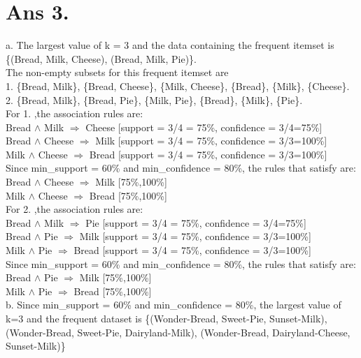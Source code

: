 \documentclass[10pt]{article}
\begin{document}
\section*{Ans 3.}
\begin{flushleft}
a. The largest value of k = 3 and the data containing the frequent itemset is \{(Bread, Milk, Cheese), (Bread, Milk, Pie)\}. \\
The non-empty subsets for this frequent itemset are \\
1. \{Bread, Milk\}, \{Bread, Cheese\}, \{Milk, Cheese\}, \{Bread\}, \{Milk\}, \{Cheese\}.\\
2. \{Bread, Milk\}, \{Bread, Pie\}, \{Milk, Pie\}, \{Bread\}, \{Milk\}, \{Pie\}.\\
\vspace{0.5em}
For 1. ,the association rules are:\\
Bread $\wedge$ Milk $\Rightarrow$ Cheese [support = 3/4 = 75\%, confidence = 3/4=75\%]\\
Bread $\wedge$ Cheese $\Rightarrow$ Milk [support = 3/4 = 75\%, confidence = 3/3=100\%]\\
Milk $\wedge$ Cheese $\Rightarrow$ Bread [support = 3/4 = 75\%, confidence = 3/3=100\%]\\
\vspace{0.5em}
Since min\_support = 60\% and min\_confidence = 80\%, the rules that satisfy are:\\
Bread $\wedge$ Cheese $\Rightarrow$ Milk [75\%,100\%]\\
Milk $\wedge$ Cheese $\Rightarrow$ Bread [75\%,100\%]\\
\vspace{1em}
For 2. ,the association rules are:\\
Bread $\wedge$ Milk $\Rightarrow$ Pie [support = 3/4 = 75\%, confidence = 3/4=75\%]\\
Bread $\wedge$ Pie $\Rightarrow$ Milk [support = 3/4 = 75\%, confidence = 3/3=100\%]\\
Milk $\wedge$ Pie $\Rightarrow$ Bread [support = 3/4 = 75\%, confidence = 3/3=100\%]\\
\vspace{0.5em}
Since min\_support = 60\% and min\_confidence = 80\%, the rules that satisfy are:\\
Bread $\wedge$ Pie $\Rightarrow$ Milk [75\%,100\%]\\
Milk $\wedge$ Pie $\Rightarrow$ Bread [75\%,100\%]\\
\vspace{0.5em}
b. Since min\_support = 60\% and min\_confidence = 80\%, the largest value of k=3 and the frequent dataset is \{(Wonder-Bread, Sweet-Pie, Sunset-Milk), (Wonder-Bread, Sweet-Pie, Dairyland-Milk), (Wonder-Bread, Dairyland-Cheese, Sunset-Milk)\}
\end{flushleft}
\end{document}
